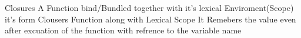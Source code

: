 Closures 
A Function bind/Bundled together with it's lexical Enviroment(Scope) it's form Clousers
Function along with Lexical Scope
It Remebers the value even after excuation of the function with refrence to the variable name